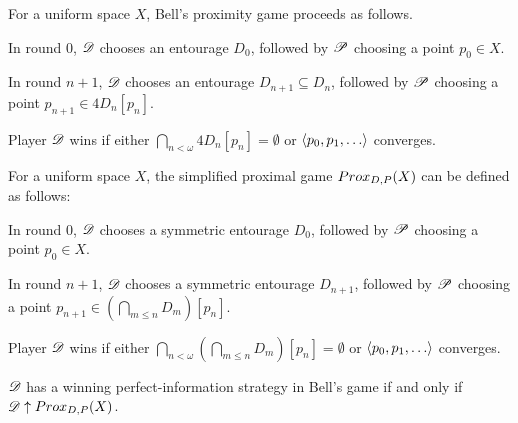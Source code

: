 \begin{definition}
  For a uniform space $X$, Bell's proximity game proceeds as follows. 

  In round $0$, $\mathscr{D}$ chooses an entourage $D_0$, followed by $\mathscr{P}$ choosing a point $p_0\in X$. 

  In round $n+1$, $\mathscr{D}$ chooses an entourage $D_{n+1}\subseteq D_n$, followed by $\mathscr{P}$ choosing a point $p_{n+1}\in 4D_n[p_n]$.

  Player $\mathscr{D}$ wins if either $\bigcap_{n<\omega} 4D_n[p_n] = \emptyset$ or $\<p_0,p_1,\dots\>$ converges.
\end{definition}

\begin{definition}
  For a uniform space $X$, the simplified proximal game $Prox_{D,P}(X)$ can be defined as follows:

  In round $0$, $\mathscr{D}$ chooses a symmetric entourage $D_0$, followed by $\mathscr{P}$ choosing a point $p_0\in X$. 

  In round $n+1$, $\mathscr{D}$ chooses a symmetric entourage $D_{n+1}$, followed by $\mathscr{P}$ choosing a point $p_{n+1}\in\left(\bigcap_{m\leq n}D_m\right)[p_n]$.

  Player $\mathscr{D}$ wins if either $\bigcap_{n<\omega}\left(\bigcap_{m\leq n} D_m\right)[p_n]=\emptyset$ or $\<p_0,p_1,\dots\>$ converges.
\end{definition}

\begin{theorem}
  $\mathscr{D}$ has a winning perfect-information strategy in Bell's game if and only if $\mathscr{D}\uparrow Prox_{D,P}(X)$.
\end{theorem}

